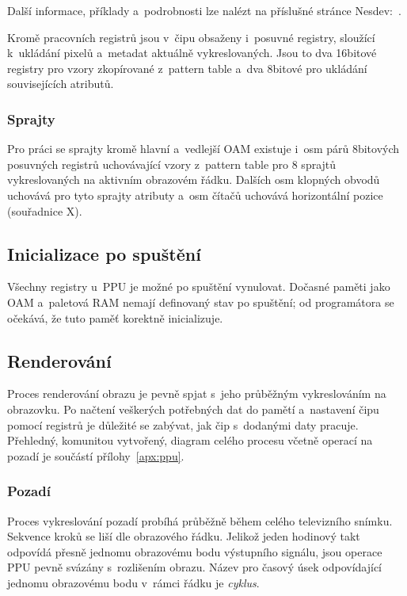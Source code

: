Další informace, příklady a~podrobnosti lze nalézt na příslušné stránce Nesdev:~\cite{Nesdev:ppu-scroll}.

Kromě pracovních registrů jsou v~čipu obsaženy i~posuvné registry, sloužící k~ukládání pixelů a~metadat aktuálně vykreslovaných. Jsou to dva 16bitové registry pro vzory zkopírované z~pattern table a~dva 8bitové pro ukládání souvisejících atributů.

\subsubsection{Sprajty}
Pro práci se sprajty kromě hlavní a~vedlejší OAM existuje i~osm párů 8bitových posuvných registrů uchovávající vzory z~pattern table pro 8 sprajtů vykreslovaných na aktivním obrazovém řádku. Dalších osm klopných obvodů uchovává pro tyto sprajty atributy a~osm čítačů uchovává horizontální pozice (souřadnice X).


\subsection{Inicializace po spuštění}
Všechny registry u~PPU je možné po spuštění vynulovat. Dočasné paměti jako OAM a~paletová RAM nemají definovaný stav po spuštění; od programátora se očekává, že tuto paměť korektně inicializuje.

\subsection{Renderování}
Proces renderování obrazu je pevně spjat s~jeho průběžným vykreslováním na obrazovku. Po načtení veškerých potřebných dat do pamětí a~nastavení čipu pomocí registrů je důležité se zabývat, jak čip s~dodanými daty pracuje. Přehledný, komunitou vytvořený, diagram celého procesu včetně operací na pozadí je součástí přílohy~\ref{apx:ppu}.

\subsubsection{Pozadí}
\label{sec:ppu-pozadi}
Proces vykreslování pozadí probíhá průběžně během celého televizního snímku. Sekvence kroků se liší dle obrazového řádku. Jelikož jeden hodinový takt odpovídá přesně jednomu obrazovému bodu výstupního signálu, jsou operace PPU pevně svázány s~rozlišením obrazu. Název pro časový úsek odpovídající jednomu obrazovému bodu v~rámci řádku je \emph{cyklus}.


